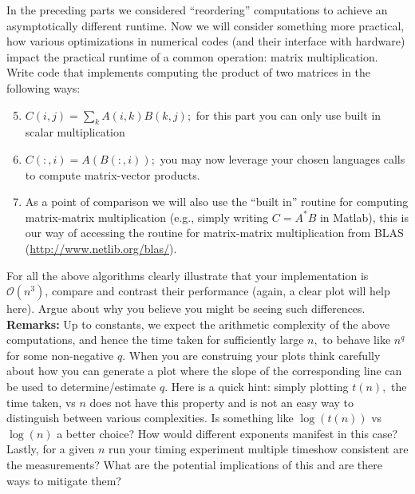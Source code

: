 \documentclass[11pt,onecolumn]{article}
\newcommand{\cO}{\mathcal{O}}
\begin{document}
\noindent
In the preceding parts we considered ``reordering'' computations to achieve an asymptotically different runtime. Now we will consider something more practical, how various optimizations in numerical codes (and their interface with hardware) impact the practical runtime of a common operation: matrix multiplication. Write code that implements computing the product of two matrices in the following ways:
\begin{enumerate}[label=(\alph*)]
\setcounter{enumi}{4}
\item $C(i,j) = \sum_k A(i,k)B(k,j);$ for this part you can only use built in scalar multiplication
\item $C(:,i) = A(B(:,i));$ you may now leverage your chosen languages calls to compute matrix-vector products.
\item As a point of comparison we will also use the ``built in'' routine for computing matrix-matrix multiplication (e.g., simply writing $C=A^*B$ in Matlab), this is our way of accessing the routine for matrix-matrix multiplication from BLAS (\url{http://www.netlib.org/blas/}). 
\end{enumerate}

\noindent
For all the above algorithms clearly illustrate that your implementation is $\cO\left(n^3\right)$, compare and contrast their performance (again, a clear plot will help here). Argue about why you believe you might be seeing such differences. \\

\noindent
\textbf{Remarks:} Up to constants, we expect the arithmetic complexity of the above computations, and hence the time taken for sufficiently large $n,$ to behave like $n^q$ for some non-negative $q.$ When you are construing your plots think carefully about how you can generate a plot where the slope of the corresponding line can be used to determine/estimate $q.$ Here is a quick hint: simply plotting $t(n),$ the time taken, vs $n$ does not have this property and is not an easy way to distinguish between various complexities. Is something like $\log(t(n))$ vs $\log(n)$ a better choice? How would different exponents manifest in this case? Lastly, for a given $n$ run your timing experiment multiple times\textemdash how consistent are the measurements? What are the potential implications of this and are there ways to mitigate them?
\end{document}

